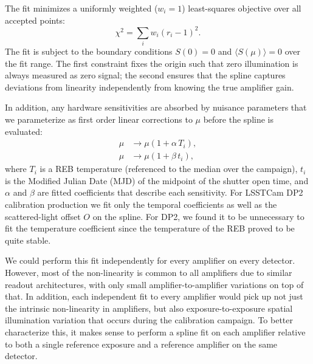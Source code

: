 The fit minimizes a uniformly weighted ($w_i = 1$) least-squares objective over all accepted points:
\begin{equation}
    \chi^2 = \sum_{i} w_i \left(r_i - 1\right)^2. \label{eq:linearity-chisq}
\end{equation}
The fit is subject to the boundary conditions $S(0) = 0$ and $\langle S(\mu)\rangle = 0$ over the fit range.
The first constraint fixes the origin such that zero illumination is always measured as zero signal; the second ensures that the spline captures deviations from linearity independently from knowing the true amplifier gain.

In addition, any hardware sensitivities are absorbed by nuisance parameters that we parameterize as first order linear corrections to $\mu$ before the spline is evaluated:
\begin{equation}
\begin{aligned}
    \mu &\rightarrow \mu \left(1 + \alpha\, T_i\right), \\
    \mu &\rightarrow \mu \left(1 + \beta\, t_i\right),
\end{aligned}
\label{eq:linearity-nuisance}
\end{equation}
where $T_i$ is a REB temperature (referenced to the median over the campaign), $t_i$ is the Modified Julian Date (MJD) of the midpoint of the shutter open time, and $\alpha$ and $\beta$ are fitted coefficients that describe each sensitivity.
For LSSTCam DP2 calibration production we fit only the temporal coefficients as well as the scattered-light offset $O$ on the spline.
For DP2, we found it to be unnecessary to fit the temperature coefficient since the temperature of the REB proved to be quite stable.

We could perform this fit independently for every amplifier on every detector. However, most of the non-linearity is common to all amplifiers due to similar readout architectures, with only small amplifier-to-amplifier variations on top of that.
In addition, each independent fit to every amplifier would pick up not just the intrinsic non-linearity in amplifiers, but also exposure-to-exposure spatial illumination variation that occurs during the calibration campaign.
To better characterize this, it makes sense to perform a spline fit on each amplifier relative to both a single reference exposure and a reference amplifier on the same detector.

